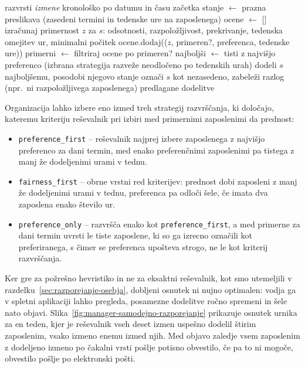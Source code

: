 \begin{algorithm}[htbp]
\caption{Poenostavljen potek požrešnega reševalnika razporejanja}
\label{alg:solver}
\begin{algorithmic}[1]
    \State razvrsti \textit{izmene} kronološko po datumu in času začetka
    \State stanje $\gets$ prazna preslikava (zasedeni termini in tedenske ure na zaposlenega)
        \State ocene $\gets$ []
            \State izračunaj primernost $z$ za $s$: odsotnosti, razpoložljivost, prekrivanje, tedenska omejitev ur, minimalni počitek
            \State ocene.dodaj(($z$, primeren?, preferenca, tedenske ure))
        \EndFor
        \State primerni $\gets$ filtriraj ocene po primeren?
            \State najboljši $\gets$ tisti z najvišjo preferenco (izbrana strategija razveže neodločeno po tedenskih urah)
            \State dodeli $s$ najboljšemu, posodobi njegovo stanje
        \Else
            \State označi $s$ kot nezasedeno, zabeleži razlog (npr.\ ni razpoložljivega zaposlenega)
        \EndIf
    \EndFor
    \State \Return predlagane dodelitve
\EndFunction
\end{algorithmic}
\end{algorithm}
\FloatBarrier

Organizacija lahko izbere eno izmed treh strategij razvrščanja, ki določajo, kateremu kriteriju reševalnik pri izbiri med primernimi zaposlenimi da prednost:

\begin{itemize}
    \item \texttt{preference\_first} -- reševalnik najprej izbere zaposlenega z najvišjo preferenco za dani termin, med enako preferenčnimi zaposlenimi pa tistega z manj že dodeljenimi urami v tednu.
    \item \texttt{fairness\_first} -- obrne vrstni red kriterijev: prednost dobi zaposleni z manj že dodeljenimi urami v tednu, preferenca pa odloči šele, če imata dva zaposlena enako število ur.
    \item \texttt{preference\_only} -- razvršča enako kot \texttt{preference\_first}, a med primerne za dani termin uvrsti le tiste zaposlene, ki so ga izrecno označili kot preferiranega, s čimer se preferenca upošteva strogo, ne le kot kriterij razvrščanja.
\end{itemize}

Ker gre za požrešno hevristiko in ne za eksaktni reševalnik, kot smo utemeljili v razdelku~\ref{sec:razporejanje-osebja}, dobljeni osnutek ni nujno optimalen: vodja ga v spletni aplikaciji lahko pregleda, posamezne dodelitve ročno spremeni in šele nato objavi. Slika~\ref{fig:manager-samodejno-razporejanje} prikazuje osnutek urnika za en teden, kjer je reševalnik vseh deset izmen uspešno dodelil štirim zaposlenim, vsako izmeno enemu izmed njih. Med objavo zaledje vsem zaposlenim z dodeljeno izmeno po čakalni vrsti pošlje potisno obvestilo, če pa to ni mogoče, obvestilo pošlje po elektronski pošti.

